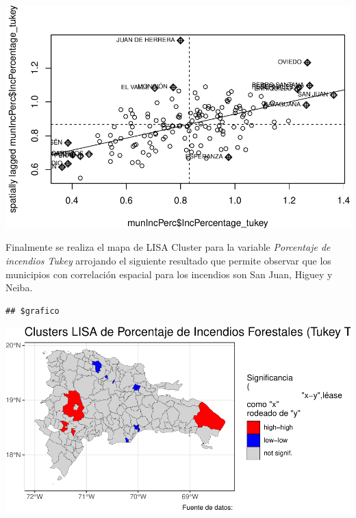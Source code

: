 \documentclass[11pt,]{article}
\newenvironment{Shaded}{\begin{snugshade}}{\end{snugshade}}
\newcommand{\KeywordTok}[1]{\textcolor[rgb]{0.13,0.29,0.53}{\textbf{#1}}}
\newcommand{\DataTypeTok}[1]{\textcolor[rgb]{0.13,0.29,0.53}{#1}}
\newcommand{\OperatorTok}[1]{\textcolor[rgb]{0.81,0.36,0.00}{\textbf{#1}}}
\newcommand{\NormalTok}[1]{#1}
\begin{document}
\begin{Shaded}
\end{Shaded}

\includegraphics{proyecto_files/figure-latex/unnamed-chunk-23-1.pdf}

Finalmente se realiza el mapa de LISA Cluster para la variable
\emph{Porcentaje de incendios Tukey} arrojando el siguiente resultado
que permite observar que los municipios con correlación espacial para
los incendios son San Juan, Higuey y Neiba.

\begin{verbatim}
## $grafico
\end{verbatim}

\includegraphics{proyecto_files/figure-latex/unnamed-chunk-24-1.pdf}
\end{document}

